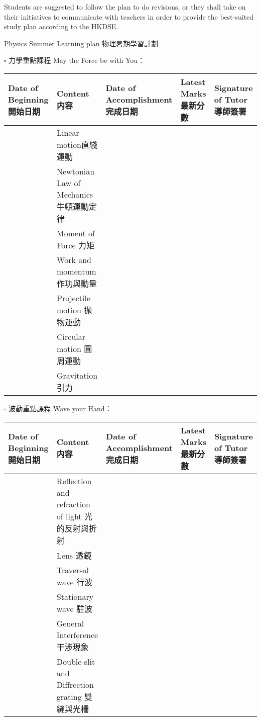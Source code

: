 \documentclass{article}
\begin{document}
    Students are suggested to follow the plan to do revisions, or they shall take on their initiatives to communicate with teachers in order to provide the best-suited study plan according to the HKDSE.

    \pagebreak
    
    \begin{center}
        Physics Summer Learning plan 物理暑期學習計劃
    \end{center}

    $\square$ 力學重點課程 May the Force be with You：
    \begin{center}
        \begin{tabular}{|m{3cm}|m{5cm}|m{4cm}|m{2cm}|m{2cm}|}
            \hline
            Date of Beginning 開始日期&Content 内容&Date of Accomplishment 完成日期&Latest Marks 最新分數&Signature of Tutor 導師簽署\\
            \hline
            &Linear motion直綫運動&&&\\
            \hline
            &Newtonian Law of Mechanics 牛頓運動定律&&&\\
            \hline
            &Moment of Force 力矩&&&\\
            \hline
            &Work and momentum 作功與動量&&&\\
            \hline
            &Projectile motion 抛物運動&&&\\
            \hline
            &Circular motion 圓周運動&&&\\
            \hline
            &Gravitation 引力&&&\\
            \hline
        \end{tabular}
    \end{center}

    $\square$ 波動重點課程 Wave your Hand：
    \begin{center}
        \begin{tabular}{|m{3cm}|m{5cm}|m{4cm}|m{2cm}|m{2cm}|}
            \hline
            Date of Beginning 開始日期&Content 内容&Date of Accomplishment 完成日期&Latest Marks 最新分數&Signature of Tutor 導師簽署\\
            \hline
            &Reflection and refraction of light 光的反射與折射&&&\\
            \hline
            &Lens 透鏡&&&\\
            \hline
            &Traversal wave 行波&&&\\
            \hline
            &Stationary wave 駐波&&&\\
            \hline
            &General Interference 干涉現象&&&\\
            \hline
            &Double-slit and Diffrection grating 雙縫與光柵&&&\\
            \hline
        \end{tabular}
    \end{center}
\end{document}
